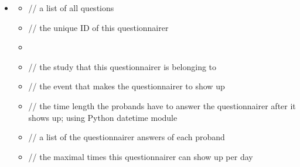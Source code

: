 \documentclass[a4paper]{scrreprt}
\begin{document}
{\begin{itemize}
                    \item {}
                        \begin{itemize}
                            \item {}
                                \par // a list of all questions
                            \item {}
                                \par // the unique ID of this questionnairer
                            \item {}
                            \item {}
                                \par // the study that this questionnairer is belonging to
                            \item {}
                                \par // the event that makes the questionnairer to show up
                            \item {}
                                \par // the time length the probands have to answer the questionnairer after it shows up; using Python datetime module
                            \item {}
                                \par // a list of the questionnairer answers of each proband
                            \item {}
                                \par // the maximal times this questionnairer can show up per day
                        \end{itemize}
                        

\end{itemize}}
\end{document}
